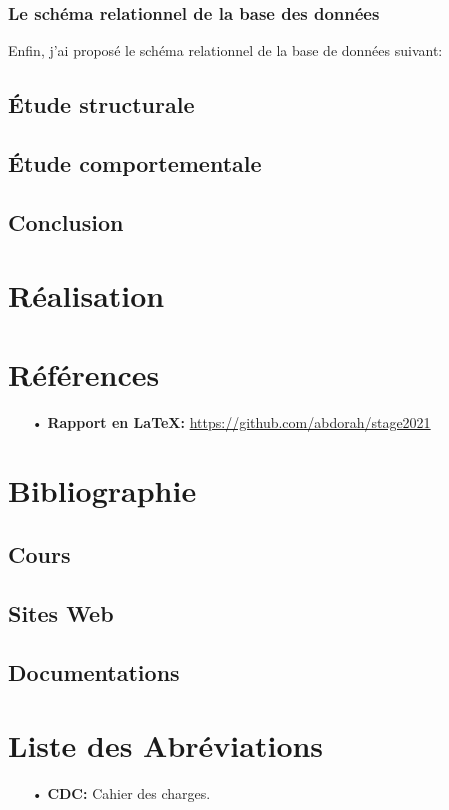 \documentclass[a4paper]{report}
\begin{document}
\begin{doublespace}
	\subsection{Le schéma relationnel de la base des données}
	Enfin, j'ai proposé le schéma relationnel de la base de données suivant:
	\section{Étude structurale}
	\section{Étude comportementale}
	\section{Conclusion}
	\chapter{Réalisation}
	\renewcommand{\headrulewidth}{1pt}
	\fancyhead[L]{\hspace*{5cm}}
\end{doublespace}
\appendix
\chapter{Références}
\begin{itemize}
	\item[•] \textbf{Rapport en \LaTeX:} \url{https://github.com/abdorah/stage2021}
\end{itemize}
\chapter{Bibliographie}
\section{Cours}
\section{Sites Web}
\section{Documentations}
\chapter{Liste des Abréviations}
\begin{itemize}
	\item[•] \textbf{CDC:} Cahier des charges.
\end{itemize}
\end{document}
